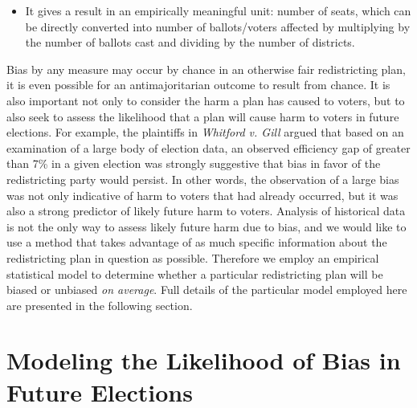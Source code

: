 \documentclass[preprint,12pt]{article}
\begin{document}
\begin{itemize}
\item It gives a result in an empirically meaningful unit: number of seats, which can be directly converted into number of ballots/voters affected by multiplying by the number of ballots cast and dividing by the number of districts.

\end{itemize}

Bias by any measure may occur by chance in an otherwise fair redistricting plan, it is even possible for an antimajoritarian outcome to result from chance.
It is also important not only to consider the harm a plan has caused to voters, but to also seek to assess the likelihood that a plan will cause harm to voters in future elections.
For example, the plaintiffs in \emph{Whitford v. Gill} argued that based on an examination of a large body of election data, an observed efficiency gap of greater than 7\% in a given election was strongly suggestive that bias in favor of the redistricting party would persist.
In other words, the observation of a large bias was not only indicative of harm to voters that had already occurred, but it was also a strong predictor of likely future harm to voters.
Analysis of historical data is not the only way to assess likely future harm due to bias, and we would like to use a method that takes advantage of as much specific information about the redistricting plan in question as possible.
Therefore we employ an empirical statistical model to determine whether a particular redistricting plan will be biased or unbiased \emph{on average}.
Full details of the particular model employed here are presented in the following section.


\section{Modeling the Likelihood of Bias in Future Elections\label{sec:FB}}
\end{document}
